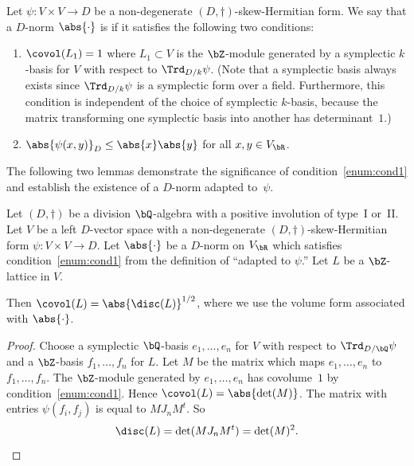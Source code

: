 Let $\psi \colon V \times V \to D$ be a non-degenerate $(D,\dag)$-skew-Hermitian form.
We say that a $D$-norm $\abs{\cdot}$ is  if it satisfies the following two conditions:
\begin{enumerate}
\item\label{enum:cond1} $\covol(L_1) = 1$ where $L_1 \subset V$ is the $\bZ$-module generated by a symplectic $k$-basis for $V$ with respect to $\Trd_{D/k} \psi$.
(Note that a symplectic basis always exists since $\Trd_{D/k} \psi$ is a symplectic form over a field. Furthermore, this condition is independent of the choice of symplectic $k$-basis, because the matrix transforming one symplectic basis into another has determinant~$1$.)
\item\label{enum:cond2} $\abs{\psi(x, y)}_D \leq \abs{x} \abs{y}$ for all $x, y \in V_\bR$.
\end{enumerate}

The following two lemmas demonstrate the significance of condition~\eqref{enum:cond1} and establish the existence of a $D$-norm adapted to~$\psi$.

\begin{lemma} \label{covol-disc-lattice}
Let $(D,\dag)$ be a division $\bQ$-algebra with a positive involution of type~I or~II.
Let $V$ be a left $D$-vector space with a non-degenerate $(D,\dag)$-skew-Hermitian form $\psi \colon V \times V \to D$.
Let $\abs{\cdot}$ be a $D$-norm on $V_\bR$ which satisfies condition~\eqref{enum:cond1} from the definition of ``adapted to $\psi$.''
Let $L$ be a $\bZ$-lattice in $V$.

Then $\covol(L) = \abs{\disc(L)}^{1/2}$, where we use the volume form associated with $\abs{\cdot}$.
\end{lemma}

\begin{proof}
Choose a symplectic $\bQ$-basis $e_1, \dotsc, e_n$ for $V$ with respect to $\Trd_{D/\bQ} \psi$ and a $\bZ$-basis $f_1, \dotsc, f_n$ for $L$.
Let $M$ be the matrix which maps $e_1, \dotsc, e_n$ to $f_1, \dotsc, f_n$.
The $\bZ$-module generated by $e_1, \dotsc, e_n$ has covolume~$1$ by condition~\eqref{enum:cond1}.
Hence $\covol(L) = \abs{\det(M)}$.
The matrix with entries $\psi(f_i, f_j)$ is equal to $MJ_nM^t$. So
\[
\disc(L) = \det(MJ_nM^t) = \det(M)^2.
\qedhere
\]
\end{proof}

